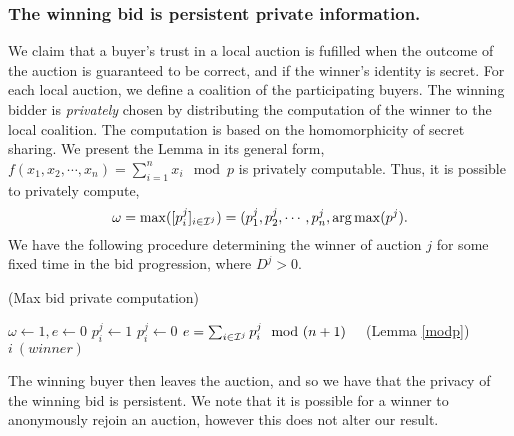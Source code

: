 \subsubsection{The winning bid is persistent private information.}
We claim that a buyer's trust in a local auction is fufilled when the outcome of
the auction is guaranteed to be correct, and if the winner's identity is secret.
For each local auction, we define a coalition of the
participating buyers. The winning bidder is \emph{privately} chosen by
distributing the computation of the winner to the local coalition. The
computation is based on the homomorphicity of secret sharing. We present the
Lemma in its general form,
{
\label{modp} \ 
    $f(x_1, x_2, \cdots, x_n) = \sum_{i=1}^n x_i \mod p$ is privately
    computable.
}
Thus, it is possible to privately compute,
\begin{equation}\label{winner}
    \omega = \max([p_i^j]_{i\in\mathcal{I}^j}) = (p_1^j, p_2^j, \cdots, p_n^j, \operatorname*{arg\,max}(p^j).
\end{equation}
We have the following procedure determining the winner of auction $j$ for
some fixed time in the bid progression, where $D^j > 0$.
\begin{center}
\begin{algorithm}
\caption{(Max bid private computation)}
\begin{algorithmic}[1]\label{maxbidcomp}
\State $\omega\gets 1, e\gets 0$
\State $p_i^j \gets 1 $
\Else
\State $p_i^j \gets 0$
\EndIf
\EndFor
\State $e = \sum_{i\in\mathcal{I}^j} p_i^j \mod (n+1)\quad$ (Lemma \ref{modp})
\For{$i \in \mcI^j$}
\Return $i \ (winner)$
\EndIf
\EndFor
\EndWhile\\
\end{algorithmic}
\end{algorithm}
\end{center}


The winning buyer then leaves the auction, and so we have that the privacy of
the winning bid is persistent. We note that it is possible for a winner to
anonymously rejoin an auction, however this does not alter our result.



